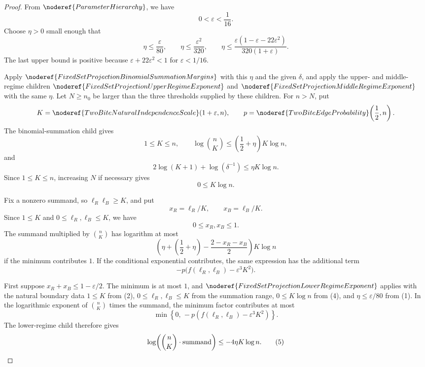 \begin{proof}
From \(\noderef{ParameterHierarchy}\), we have
\[
0<\varepsilon<\frac1{16}.
\]
Choose \(\eta>0\) small enough that
\[
\eta\le \frac{\varepsilon}{80},\qquad
\eta\le \frac{\varepsilon^2}{320},\qquad
\eta\le
\frac{\varepsilon(1-\varepsilon-22\varepsilon^2)}
     {320(1+\varepsilon)}.
\tag{1}
\]
The last upper bound is positive because
\(\varepsilon+22\varepsilon^2<1\) for \(\varepsilon<1/16\).

Apply \(\noderef{FixedSetProjectionBinomialSummationMargins}\) with this
\(\eta\) and the given \(\delta\), and apply the upper- and middle-regime
children
\(\noderef{FixedSetProjectionUpperRegimeExponent}\) and
\(\noderef{FixedSetProjectionMiddleRegimeExponent}\) with the same \(\eta\).
Let \(N\ge n_0\) be larger than the three thresholds supplied by these children.
For \(n>N\), put
\[
K=\noderef{TwoBiteNaturalIndependenceScale}(1+\varepsilon,n),
\qquad
p=\noderef{TwoBiteEdgeProbability}\!\left(\frac12,n\right).
\]
The binomial-summation child gives
\[
1\le K\le n,\qquad
\log\binom nK\le \left(\frac12+\eta\right)K\log n, \tag{2}
\]
and
\[
2\log(K+1)+\log(\delta^{-1})\le \eta K\log n. \tag{3}
\]
Since \(1\le K\le n\), increasing \(N\) if necessary gives
\[
0\le K\log n. \tag{4}
\]

Fix a nonzero summand, so \(\ell_R\ell_B\ge K\), and put
\[
x_R=\ell_R/K,\qquad x_B=\ell_B/K.
\]
Since \(1\le K\) and \(0\le\ell_R,\ell_B\le K\), we have
\[
0\le x_R,x_B\le1.
\]
The summand multiplied by \(\binom nK\) has logarithm at most
\[
\left(\eta+\left(\frac12+\eta\right)-\frac{2-x_R-x_B}{2}\right)K\log n
\]
if the minimum contributes \(1\).  If the conditional exponential contributes,
the same expression has the additional term
\[
-p\bigl(f(\ell_R,\ell_B)-\varepsilon^3K^2\bigr).
\]

First suppose \(x_R+x_B\le1-\varepsilon/2\).  The minimum is at most \(1\), and
\(\noderef{FixedSetProjectionLowerRegimeExponent}\) applies with the natural
boundary data \(1\le K\) from (2), \(0\le\ell_R,\ell_B\le K\) from the summation
range, \(0\le K\log n\) from (4), and \(\eta\le\varepsilon/80\) from (1).  In
the logarithmic exponent of \(\binom nK\) times the summand, the minimum factor
contributes at most
\[
\min\left\{0,\,
-p\left(f(\ell_R,\ell_B)-\varepsilon^3K^2\right)\right\}.
\]
The lower-regime child therefore gives
\[
\log\!\left(\binom nK\cdot\hbox{summand}\right)\le -4\eta K\log n. \tag{5}
\]


\end{proof}
